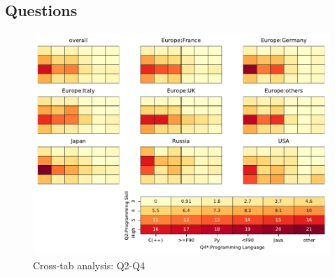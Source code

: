 
\subsection{Questions}


\begin{figure}
\begin{center}
\includegraphics[width=12cm]{../pdfs/Q2-Q4.pdf}
\caption{Cross-tab analysis: Q2-Q4}
\label{fig:Q2-Q4}
\end{center}
\end{figure}
